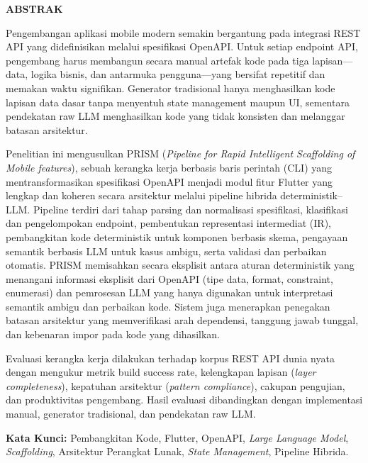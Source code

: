 \begin{center}
    {\fontsize{12pt}{14pt}\selectfont\textbf{ABSTRAK}\par}
    \vspace{0.8cm}
\end{center}

Pengembangan aplikasi mobile modern semakin bergantung pada integrasi REST API yang didefinisikan melalui spesifikasi OpenAPI. Untuk setiap endpoint API, pengembang harus membangun secara manual artefak kode pada tiga lapisan---data, logika bisnis, dan antarmuka pengguna---yang bersifat repetitif dan memakan waktu signifikan. Generator tradisional hanya menghasilkan kode lapisan data dasar tanpa menyentuh state management maupun UI, sementara pendekatan raw LLM menghasilkan kode yang tidak konsisten dan melanggar batasan arsitektur.

Penelitian ini mengusulkan PRISM (\textit{Pipeline for Rapid Intelligent Scaffolding of Mobile features}), sebuah kerangka kerja berbasis baris perintah (CLI) yang mentransformasikan spesifikasi OpenAPI menjadi modul fitur Flutter yang lengkap dan koheren secara arsitektur melalui pipeline hibrida deterministik--LLM. Pipeline terdiri dari tahap parsing dan normalisasi spesifikasi, klasifikasi dan pengelompokan endpoint, pembentukan representasi intermediat (IR), pembangkitan kode deterministik untuk komponen berbasis skema, pengayaan semantik berbasis LLM untuk kasus ambigu, serta validasi dan perbaikan otomatis. PRISM memisahkan secara eksplisit antara aturan deterministik yang menangani informasi eksplisit dari OpenAPI (tipe data, format, constraint, enumerasi) dan pemrosesan LLM yang hanya digunakan untuk interpretasi semantik ambigu dan perbaikan kode. Sistem juga menerapkan penegakan batasan arsitektur yang memverifikasi arah dependensi, tanggung jawab tunggal, dan kebenaran impor pada kode yang dihasilkan.

Evaluasi kerangka kerja dilakukan terhadap korpus REST API dunia nyata dengan mengukur metrik build success rate, kelengkapan lapisan (\textit{layer completeness}), kepatuhan arsitektur (\textit{pattern compliance}), cakupan pengujian, dan produktivitas pengembang. Hasil evaluasi dibandingkan dengan implementasi manual, generator tradisional, dan pendekatan raw LLM.

\vspace{0.5cm}
\noindent \textbf{Kata Kunci:} Pembangkitan Kode, Flutter, OpenAPI, \textit{Large Language Model}, \textit{Scaffolding}, Arsitektur Perangkat Lunak, \textit{State Management}, Pipeline Hibrida.

